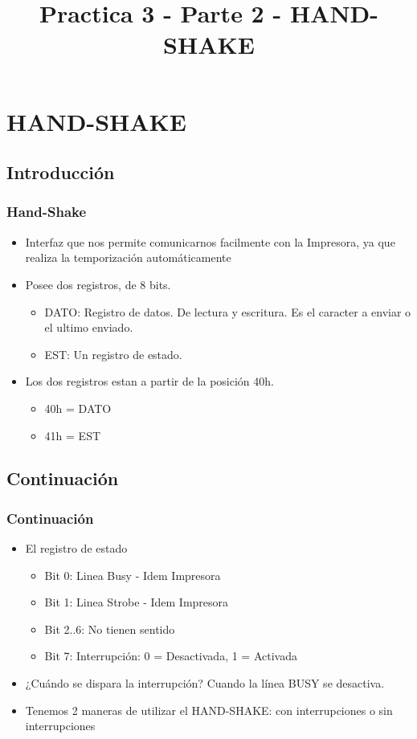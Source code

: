 \documentclass{beamer}
\title{Practica 3 - Parte 2 - HAND-SHAKE}
\begin{document}
\begin{frame}
\titlepage
\end{frame}

\section{HAND-SHAKE}
\subsection{Introducción}
\begin{frame}
\frametitle{Hand-Shake}
\begin{itemize}
 \item Interfaz que nos permite comunicarnos facilmente con la Impresora, ya que realiza la temporización automáticamente
 \item Posee dos registros, de 8 bits.
  \begin{itemize}
   \item DATO: Registro de datos. De lectura y escritura. Es el caracter a enviar o el ultimo enviado.
   \item EST: Un registro de estado.
  \end{itemize}
 \item Los dos registros estan a partir de la posición 40h. 
  \begin{itemize}
      \item 40h = DATO
      \item 41h = EST
\end{itemize}
\end{itemize}
\end{frame}

\subsection{Continuación}
\begin{frame}
\frametitle{Continuación}
\begin{itemize}
 \item El registro de estado 
 \begin{itemize}
   \item Bit 0: Linea Busy - Idem Impresora
   \item Bit 1: Linea Strobe - Idem Impresora
   \item Bit 2..6: No tienen sentido
   \item Bit 7: Interrupción: 0 = Desactivada, 1 = Activada
  \end{itemize}
 \item ¿Cuándo se dispara la interrupción? Cuando la línea BUSY se desactiva.
 \item Tenemos 2 maneras de utilizar el HAND-SHAKE: con interrupciones o sin interrupciones
\end{itemize}
\end{frame}
\end{document}
